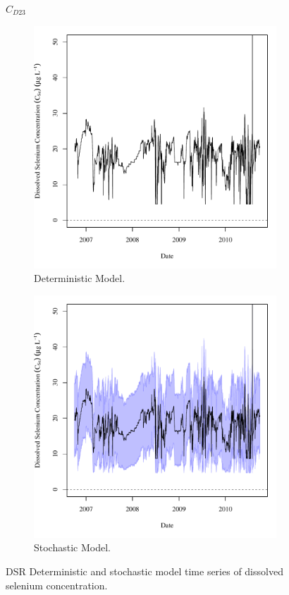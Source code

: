 \subfiguremid
\begin{landscape}
	\begin{figure}
		$ C_{D23} $
		\begin{subfigure}{0.7\textwidth}
			\centering
			\includegraphics[width=\tableCustomSize]{"Figures/Results_DSR/Deterministic/c TS BIG"}
			\caption{Deterministic Model.}
		\end{subfigure}%
		\begin{subfigure}{0.7\textwidth}
			\centering
			\includegraphics[width=\tableCustomSize]{"Figures/Results_DSR/Stochastic/c TS BIG"}
			\caption{Stochastic Model.}
		\end{subfigure}
		\caption{DSR Deterministic and stochastic model time series of dissolved selenium concentration.}
	\end{figure}
\end{landscape}

